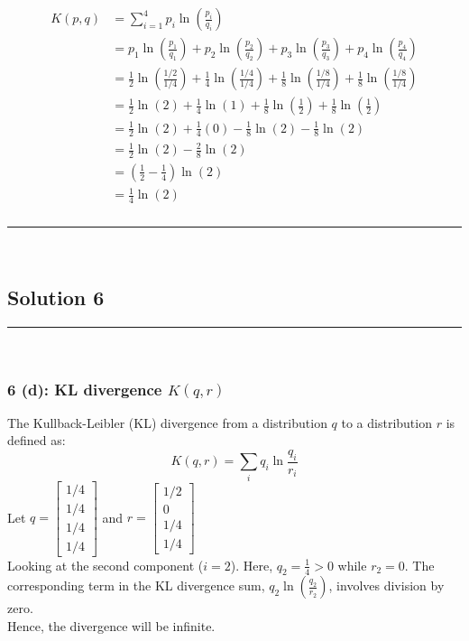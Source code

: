 \documentclass{article}
\begin{document}
\begin{align*}
K(p, q) &= \sum_{i=1}^{4} p_i \ln\left(\frac{p_i}{q_i}\right) \\
&= p_1 \ln\left(\frac{p_1}{q_1}\right) + p_2 \ln\left(\frac{p_2}{q_2}\right) + p_3 \ln\left(\frac{p_3}{q_3}\right) + p_4 \ln\left(\frac{p_4}{q_4}\right) \\
&= \frac{1}{2}\ln\left(\frac{1/2}{1/4}\right) + \frac{1}{4}\ln\left(\frac{1/4}{1/4}\right) + \frac{1}{8}\ln\left(\frac{1/8}{1/4}\right) + \frac{1}{8}\ln\left(\frac{1/8}{1/4}\right) \\
&= \frac{1}{2}\ln(2) + \frac{1}{4}\ln(1) + \frac{1}{8}\ln\left(\frac{1}{2}\right) + \frac{1}{8}\ln\left(\frac{1}{2}\right) \\
&= \frac{1}{2}\ln(2) + \frac{1}{4}(0) - \frac{1}{8}\ln(2) - \frac{1}{8}\ln(2) \\
&= \frac{1}{2}\ln(2) - \frac{2}{8}\ln(2) \\
&= \left(\frac{1}{2} - \frac{1}{4}\right)\ln(2) \\
&= \frac{1}{4}\ln(2)
\end{align*}

\subsubsection*{}
\noindent\rule{\textwidth}{0.4pt}\\

\newpage

\subsection*{Solution 6}
\noindent\rule{\textwidth}{0.4pt}\\

\subsubsection*{6 (d): KL divergence $K(q, r)$}
\parbox{\textwidth}{
The Kullback-Leibler (KL) divergence from a distribution $q$ to a distribution $r$ is defined as:
$$K(q, r) = \sum_{i} q_i \ln \frac{q_i}{r_i}$$
Let $q = \begin{bmatrix} 1/4 \\ 1/4 \\ 1/4 \\ 1/4 \end{bmatrix}$ and $r = \begin{bmatrix} 1/2 \\ 0 \\ 1/4 \\ 1/4 \end{bmatrix}$ \\

Looking at the second component ($i=2$). Here, $q_2 = \frac{1}{4} > 0$ while $r_2 = 0$. The corresponding term in the KL divergence sum, $q_2 \ln\left(\frac{q_2}{r_2}\right)$, involves division by zero. \\

Hence, the divergence will be infinite.
}
\end{document}
